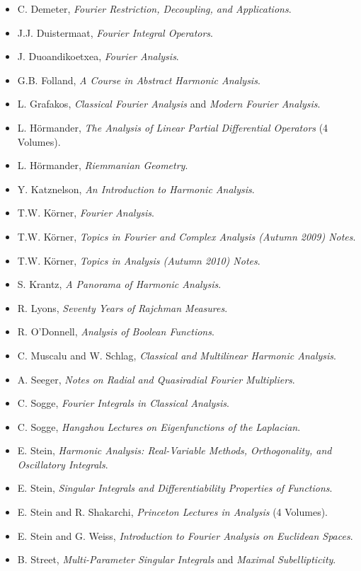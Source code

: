 \begin{itemize}
	\item C. Demeter, \emph{Fourier Restriction, Decoupling, and Applications}.
	\item J.J. Duistermaat, \emph{Fourier Integral Operators}.
	\item J. Duoandikoetxea, \emph{Fourier Analysis}.
	\item G.B. Folland, \emph{A Course in Abstract Harmonic Analysis}.
	\item L. Grafakos, \emph{Classical Fourier Analysis} and \emph{Modern Fourier Analysis}.
	\item L. H\"{o}rmander, \emph{The Analysis of Linear Partial Differential Operators} (4 Volumes).
	\item L. H\"{o}rmander, \emph{Riemmanian Geometry}.
	\item Y. Katznelson, \emph{An Introduction to Harmonic Analysis}.
	\item T.W. K\"{o}rner, \emph{Fourier Analysis}.
	\item T.W. K\"{o}rner, \emph{Topics in Fourier and Complex Analysis (Autumn 2009) Notes}.
	\item T.W. K\"{o}rner, \emph{Topics in Analysis (Autumn 2010) Notes}.
	\item S. Krantz, \emph{A Panorama of Harmonic Analysis}.
	\item R. Lyons, \emph{Seventy Years of Rajchman Measures}.
	\item R. O'Donnell, \emph{Analysis of Boolean Functions}.
	\item C. Muscalu and W. Schlag, \emph{Classical and Multilinear Harmonic Analysis}.
	\item A. Seeger, \emph{Notes on Radial and Quasiradial Fourier Multipliers}.
	\item C. Sogge, \emph{Fourier Integrals in Classical Analysis}.
	\item C. Sogge, \emph{Hangzhou Lectures on Eigenfunctions of the Laplacian}.
	\item E. Stein, \emph{Harmonic Analysis: Real-Variable Methods, Orthogonality, and Oscillatory Integrals}.
	\item E. Stein, \emph{Singular Integrals and Differentiability Properties of Functions}.
	\item E. Stein and R. Shakarchi, \emph{Princeton Lectures in Analysis} (4 Volumes).
	\item E. Stein and G. Weiss, \emph{Introduction to Fourier Analysis on Euclidean Spaces}.
	\item B. Street, \emph{Multi-Parameter Singular Integrals} and \emph{Maximal Subellipticity}.

\end{itemize}
